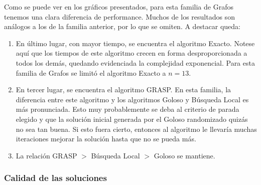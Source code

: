Como se puede ver en los gráficos presentados, para esta familia de Grafos tenemos una clara diferencia de performance. Muchos de los resultados son análogos a los de la familia anterior, por lo que se omiten. A destacar queda:
\begin{enumerate}
    \item En último lugar, con mayor tiempo, se encuentra el algoritmo Exacto. Notese aquí que los tiempos de este algoritmo crecen en forma desproporcionada a todos los demás, quedando evidenciada la complejidad exponencial. Para esta familia de Grafos se limitó el algoritmo Exacto a $n=13$.
    \item En tercer lugar, se encuentra el algoritmo GRASP. En esta familia, la diferencia entre este algoritmo y los algoritmos Goloso y Búsqueda Local es más pronunciada. Esto muy probablemente se deba al criterio de parada elegido y que la solución inicial generada por el Goloso randomizado quizás no sea tan buena. Si esto fuera cierto, entonces al algoritmo le llevaría muchas iteraciones mejorar la solución hasta que no se pueda más.
    \item La relación GRASP $>$ Búsqueda Local $>$ Goloso se mantiene.
\end{enumerate}

\subsubsection{Calidad de las soluciones}
\begin{center}
\end{center}

